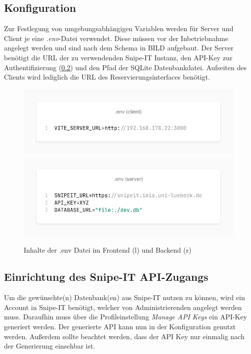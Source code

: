 \subsection{Konfiguration}
Zur Festlegung von umgebungsabhängigen Variablen werden für Server und Client je eine
\textit{.env}-Datei verwendet. Diese müssen vor der Inbetriebnahme angelegt werden und sind nach dem
Schema in BILD aufgebaut. Der Server benötigt die URL der zu verwendenden Snipe-IT Instanz, den
API-Key zur Authentifizierung (\ref{section:api}) und den Pfad der SQLite Datenbankdatei.
Aufseiten des Clients wird lediglich die URL des Reservierungsinterfaces benötigt.

\begin{figure}[h]
  \centering
  \includegraphics[scale=0.25]{Bilder/client.png}
  \includegraphics[scale=0.25]{Bilder/sever.png}
  \caption[Inhalte der .env Datei im Frontend (links) und Backend (rechts)]{Inhalte der .env Datei im Frontend (l) und Backend (r)}
  \label{fig:env}
\end{figure}


\subsection{Einrichtung des Snipe-IT API-Zugangs}
\label{section:api}
Um die gewünschte(n) Datenbank(en) aus Snipe-IT nutzen zu können, wird ein Account in Snipe-IT
benötigt, welcher von Administrierenden angelegt werden muss. Daraufhin muss über die
Profileinstellung \textit{Manage API Keys} ein API-Key generiert werden. Der generierte API kann nun
in der Konfiguration genutzt werden. Außerdem sollte beachtet werden, dass der API Key nur einmalig
nach der Generierung einsehbar ist.

